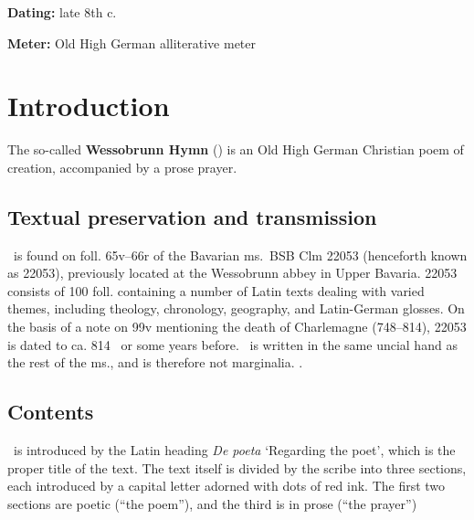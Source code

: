
\begin{flushright}%
\textbf{Dating:} late 8th c.

\textbf{Meter:} Old High German alliterative meter
\end{flushright}%

\section{Introduction}

The so-called \textbf{Wessobrunn Hymn} (\Wessobrunn) is an Old High German Christian poem of creation, accompanied by a prose prayer.

\subsection{Textual preservation and transmission}

\Wessobrunn\ is found on foll. 65v--66r of the Bavarian ms.~BSB Clm \textup{22053} (henceforth known as \textup{22053}), previously located at the Wessobrunn abbey in Upper Bavaria.  \textup{22053} consists of 100 foll. containing a number of Latin texts dealing with varied themes, including theology, chronology, geography, and Latin-German glosses.  On the basis of a note on 99v mentioning the death of Charlemagne (748--814), \textup{22053} is dated to ca. 814 \ce\ or some years before.  \Wessobrunn\ is written in the same uncial hand as the rest of the ms., and is therefore not marginalia. \parencite[83--84]{Bierbrauer1990}.

\subsection{Contents}

\Wessobrunn\ is introduced by the Latin heading \emph{De poeta} ‘Regarding the poet’, which is the proper title of the text.  The text itself is divided by the scribe into three sections, each introduced by a capital letter adorned with dots of red ink.  The first two sections are poetic (“the poem”), and the third is in prose (“the prayer”)

